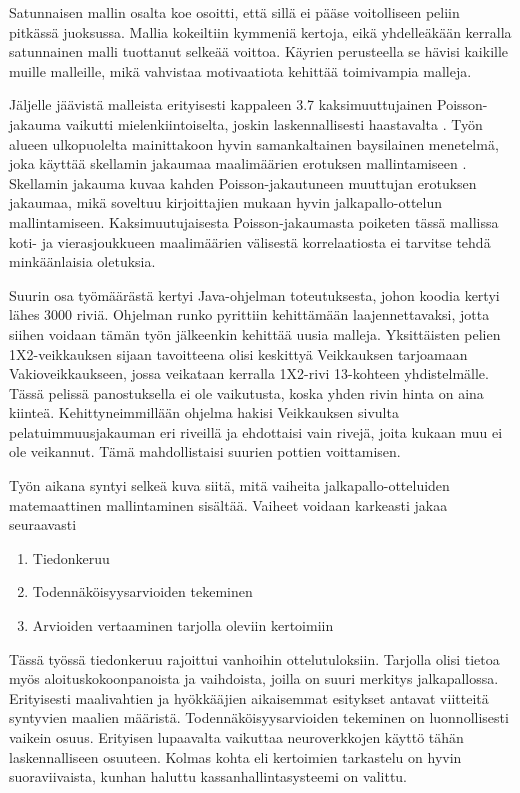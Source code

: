 \documentclass[a4paper,finnish,titlepage,12pt]{article}
\begin{document}
Satunnaisen mallin osalta koe osoitti, että sillä ei pääse voitolliseen peliin pitkässä juoksussa.
Mallia kokeiltiin kymmeniä kertoja, eikä yhdelleäkään kerralla satunnainen malli tuottanut selkeää voittoa.
Käyrien perusteella se hävisi kaikille muille malleille, mikä vahvistaa motivaatiota kehittää toimivampia malleja.

Jäljelle jäävistä malleista erityisesti kappaleen 3.7 kaksimuuttujainen Poisson-jakauma vaikutti mielenkiintoiselta, joskin laskennallisesti haastavalta \cite{bivariate}.
Työn alueen ulkopuolelta mainittakoon hyvin samankaltainen baysilainen menetelmä, joka käyttää skellamin jakaumaa maalimäärien erotuksen mallintamiseen \cite{skellam}. 
Skellamin jakauma kuvaa kahden Poisson-jakautuneen muuttujan erotuksen jakaumaa, mikä soveltuu kirjoittajien mukaan hyvin jalkapallo-ottelun mallintamiseen.
Kaksimuutujaisesta Poisson-jakaumasta poiketen tässä mallissa koti- ja vierasjoukkueen maalimäärien välisestä korrelaatiosta ei tarvitse tehdä minkäänlaisia oletuksia.


Suurin osa työmäärästä kertyi Java-ohjelman toteutuksesta, johon koodia kertyi lähes 3000 riviä. 
Ohjelman runko pyrittiin kehittämään laajennettavaksi, jotta siihen voidaan tämän työn jälkeenkin kehittää uusia malleja.
Yksittäisten pelien 1X2-veikkauksen sijaan tavoitteena olisi keskittyä Veikkauksen tarjoamaan Vakioveikkaukseen, jossa veikataan kerralla 1X2-rivi 13-kohteen yhdistelmälle. Tässä pelissä panostuksella ei ole vaikutusta, koska yhden rivin hinta on aina kiinteä.
Kehittyneimmillään ohjelma hakisi Veikkauksen sivulta pelatuimmuusjakauman eri riveillä ja ehdottaisi vain rivejä, joita kukaan muu ei ole veikannut. 
Tämä mahdollistaisi suurien pottien voittamisen.

Työn aikana syntyi selkeä kuva siitä, mitä vaiheita jalkapallo-otteluiden matemaattinen mallintaminen sisältää.
Vaiheet voidaan karkeasti jakaa seuraavasti
\begin{enumerate}
	\item{Tiedonkeruu}
	\item{Todennäköisyysarvioiden tekeminen}
	\item{Arvioiden vertaaminen tarjolla oleviin kertoimiin}
\end{enumerate}
Tässä työssä tiedonkeruu rajoittui vanhoihin ottelutuloksiin. 
Tarjolla olisi tietoa myös aloituskokoonpanoista ja vaihdoista, joilla on suuri merkitys jalkapallossa.
Erityisesti maalivahtien ja hyökkääjien aikaisemmat esitykset antavat viitteitä syntyvien maalien määristä.
Todennäköisyysarvioiden tekeminen on luonnollisesti vaikein osuus.
Erityisen lupaavalta vaikuttaa neuroverkkojen käyttö tähän laskennalliseen osuuteen.
Kolmas kohta eli kertoimien tarkastelu on hyvin suoraviivaista, kunhan haluttu kassanhallintasysteemi on valittu.
\end{document}

